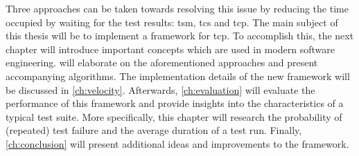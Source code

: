\noindent Three approaches can be taken towards resolving this issue by reducing the time occupied by waiting for the test results: \acrfull{tsm}, \acrfull{tcs} and \acrfull{tcp}. The main subject of this thesis will be to implement a framework for \acrshort{tcp}. To accomplish this, the next chapter will introduce important concepts which are used in modern software engineering.  will elaborate on the aforementioned approaches and present accompanying algorithms. The implementation details of the new framework will be discussed in \cref{ch:velocity}. Afterwards, \cref{ch:evaluation} will evaluate the performance of this framework and provide insights into the characteristics of a typical test suite. More specifically, this chapter will research the probability of (repeated) test failure and the average duration of a test run. Finally, \cref{ch:conclusion} will present additional ideas and improvements to the framework.